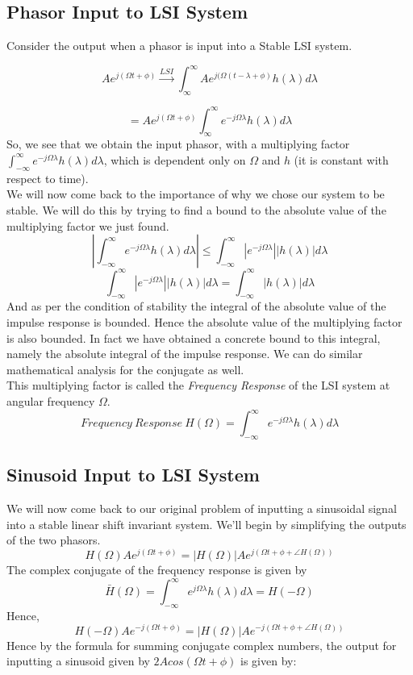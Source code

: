   
\subsection{Phasor Input to LSI System}
Consider the output when a phasor is input into a Stable LSI system.

\[
Ae^{j(\Omega t + \phi)} \xrightarrow{LSI} 
 \int_{\infty}^{\infty}Ae^{j(\Omega (t - \lambda + \phi)}h(\lambda)d\lambda
\]
 
\[ =
Ae^{j(\Omega t + \phi)} \int_{\infty}^{\infty}{e^{-j\Omega\lambda}h(\lambda)d\lambda}
\]
So, we see that we obtain the input phasor, with a multiplying factor $\int_{-\infty}^{\infty}{e^{-j\Omega\lambda}h(\lambda)d\lambda}$, which is dependent only on $\Omega$ and $h$ (it is constant with respect to time).\\
We will now come back to the importance of why we chose our system to be stable. We will do this by trying to find a bound to the absolute value of the multiplying factor we just found.
\[
| \int_{-\infty}^{\infty}{e^{-j\Omega\lambda}h(\lambda)d\lambda} | \leq 
\int_{-\infty}^{\infty} { |e^{-j\Omega\lambda}||h(\lambda)| d\lambda }
\]
\[
\int_{-\infty}^{\infty} { |e^{-j\Omega\lambda}||h(\lambda)| d\lambda } =
\int_{-\infty}^{\infty} {|h(\lambda)| d\lambda }
\]
And as per the condition of stability the integral of the absolute value of the impulse response is bounded. Hence the absolute value of the multiplying factor is also bounded. In fact we have obtained a concrete bound to this integral, namely the absolute integral of the impulse response. We can do similar mathematical analysis for the conjugate as well.\\
This multiplying factor is called the \textit{Frequency Response} of the LSI system at angular frequency $\Omega$.
\[
	Frequency\ Response\ H(\Omega) = \int_{-\infty}^{\infty}{e^{-j\Omega\lambda}h(\lambda)d\lambda}
\] 


\subsection{Sinusoid Input to LSI System}

We will now come back to our original problem of inputting a sinusoidal signal into a stable linear shift invariant system. We'll begin by simplifying the outputs of the two phasors.
\[
	H(\Omega)Ae^{j(\Omega t + \phi)} = |H(\Omega)|Ae^{j(\Omega t + \phi +  \angle  H(\Omega))}
\]
The complex conjugate of the frequency response is given by
\[
\bar{H}(\Omega) = \int_{-\infty}^{\infty}{e^{j\Omega\lambda}h(\lambda)d\lambda} = H(-\Omega)
\]
Hence,
\[
H(-\Omega)Ae^{-j(\Omega t + \phi)} = |H(\Omega)|Ae^{-j(\Omega t + \phi +  \angle  H(\Omega))}
\]
Hence by the formula for summing conjugate complex numbers, the output for inputting a sinusoid given by $2Acos(\Omega t + \phi)$ is given by:

